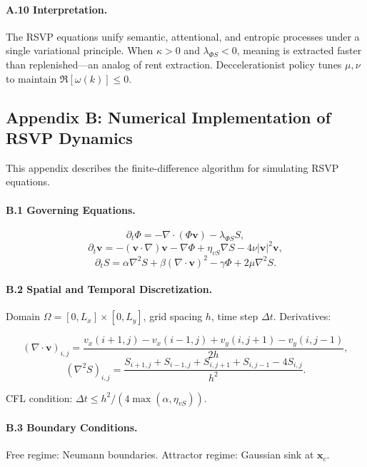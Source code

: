 \documentclass[12pt]{article}
\begin{document}
\paragraph{A.10 Interpretation.}

The RSVP equations unify semantic, attentional, and entropic processes under a single variational principle. When \(\kappa > 0\) and \(\lambda_{\Phi S} < 0\), meaning is extracted faster than replenished—an analog of rent extraction. Deccelerationist policy tunes \(\mu, \nu\) to maintain \(\Re[\omega(k)] \leq 0\).

\subsection*{Appendix B: Numerical Implementation of RSVP Dynamics}

This appendix describes the finite-difference algorithm for simulating RSVP equations.

\paragraph{B.1 Governing Equations.}

\[
\partial_t \Phi = -\nabla \cdot (\Phi \mathbf{v}) - \lambda_{\Phi S} S,
\]
\[
\partial_t \mathbf{v} = -(\mathbf{v} \cdot \nabla) \mathbf{v} - \nabla \Phi + \eta_{vS} \nabla S - 4 \nu |\mathbf{v}|^2 \mathbf{v},
\]
\[
\partial_t S = \alpha \nabla^2 S + \beta (\nabla \cdot \mathbf{v})^2 - \gamma \Phi + 2 \mu \nabla^2 S.
\]

\paragraph{B.2 Spatial and Temporal Discretization.}

Domain \(\Omega = [0, L_x] \times [0, L_y]\), grid spacing \(h\), time step \(\Delta t\). Derivatives:

\[
(\nabla \cdot \mathbf{v})_{i,j} = \frac{v_x(i+1,j) - v_x(i-1,j) + v_y(i,j+1) - v_y(i,j-1)}{2h},
\]
\[
(\nabla^2 S)_{i,j} = \frac{S_{i+1,j} + S_{i-1,j} + S_{i,j+1} + S_{i,j-1} - 4 S_{i,j}}{h^2}.
\]

CFL condition: \(\Delta t \leq h^2 / (4 \max(\alpha, \eta_{vS}))\).

\paragraph{B.3 Boundary Conditions.}

Free regime: Neumann boundaries. Attractor regime: Gaussian sink at \(\mathbf{x}_c\).
\end{document}
